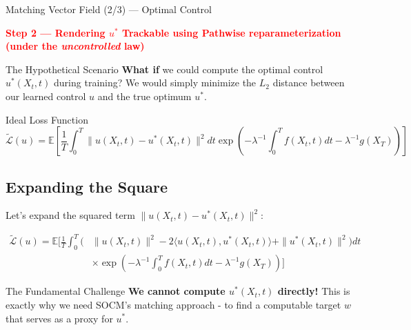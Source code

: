 \documentclass[aspectratio=169,xcolor=dvipsnames]{beamer}
\begin{document}
\begin{frame}[allowframebreaks]{Matching Vector Field (2/3) — Optimal Control}

    \begin{center}
    \Large\textcolor{red}{\textbf{Step 2 — Rendering $u^*$ Trackable using Pathwise reparameterization (under the \emph{uncontrolled} law)}}
    \end{center}

    \begin{block}{The Hypothetical Scenario}
        \textbf{What if} we could compute the optimal control $u^*(X_t, t)$ during training? We would simply minimize the $L_2$ distance between our learned control $u$ and the true optimum $u^*$.
    \end{block}
    
    \vspace{0.5cm}
    
    \begin{alertblock}{Ideal Loss Function}
        \begin{equation}
        \tilde{\mathcal{L}}(u) = \mathbb{E}\left[\frac{1}{T}\int_0^T \|u(X_t,t) - u^*(X_t,t)\|^2 dt \exp\left(-\lambda^{-1}\int_0^T f(X_t,t) dt - \lambda^{-1}g(X_T)\right)\right]
        \end{equation}
    \end{alertblock}
    
    \vspace{0.8cm}
    
    \subsection*{Expanding the Square}
    
    Let's expand the squared term $\|u(X_t,t) - u^*(X_t,t)\|^2$:
    
    \begin{equation}
    \begin{aligned}
    \tilde{\mathcal{L}}(u) = \mathbb{E}\Bigg[\frac{1}{T}\int_0^T \Big(
    &\|u(X_t,t)\|^2 - 2\langle u(X_t,t), u^*(X_t,t)\rangle + \|u^*(X_t,t)\|^2\Big) dt \\[4pt]
    &\times \exp\left(-\lambda^{-1}\int_0^T f(X_t,t) dt - \lambda^{-1}g(X_T)\right)\Bigg]
    \end{aligned}
    \end{equation}
        
    \vspace{0.5cm}
    
    \begin{alertblock}{The Fundamental Challenge}
        \textbf{We cannot compute $u^*(X_t,t)$ directly!} This is exactly why we need SOCM's matching approach - to find a computable target $w$ that serves as a proxy for $u^*$.
    \end{alertblock}


\end{frame}
\end{document}
